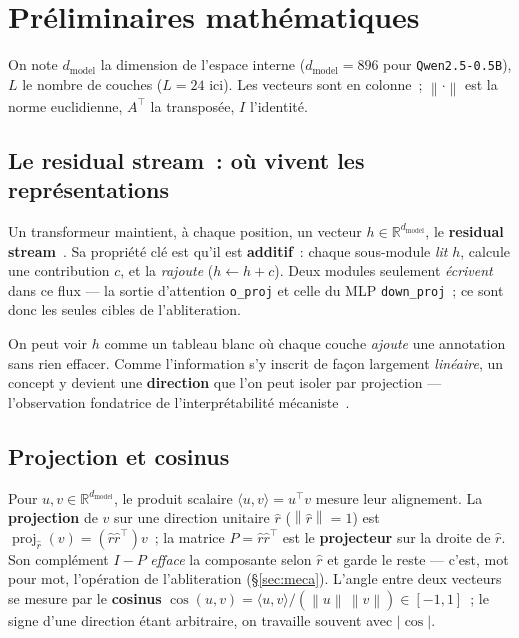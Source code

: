\documentclass[11pt,a4paper]{article}
\theoremstyle{definition}
\theoremstyle{plain}
\newcommand{\R}{\mathbb{R}}
\newcommand{\rhat}{\hat{r}}
\newcommand{\norm}[1]{\left\lVert #1 \right\rVert}
\newcommand{\inner}[2]{\langle #1, #2 \rangle}
\newcommand{\dmodel}{d_{\text{model}}}
\DeclareMathOperator{\proj}{proj}
\begin{document}
\section{Préliminaires mathématiques}\label{sec:prelim}
On note $\dmodel$ la dimension de l'espace interne ($\dmodel=896$ pour
\texttt{Qwen2.5-0.5B}), $L$ le nombre de couches ($L=24$ ici). Les vecteurs sont en
colonne~; $\norm{\cdot}$ est la norme euclidienne, $A^\top$ la transposée, $I$
l'identité.

\subsection{Le \og residual stream\fg{}~: où vivent les représentations}
Un transformeur maintient, à chaque position, un vecteur $h\in\R^{\dmodel}$, le
\textbf{residual stream}~\cite{elhage2021}. Sa propriété clé est qu'il est
\textbf{additif}~: chaque sous-module \emph{lit} $h$, calcule une contribution $c$,
et la \emph{rajoute} ($h\leftarrow h+c$). Deux modules seulement \emph{écrivent}
dans ce flux — la sortie d'attention \texttt{o\_proj} et celle du MLP
\texttt{down\_proj}~; ce sont donc les seules cibles de l'abliteration.

\begin{intuition}
On peut voir $h$ comme un tableau blanc où chaque couche \emph{ajoute} une
annotation sans rien effacer. Comme l'information s'y inscrit de façon largement
\emph{linéaire}, un concept y devient une \textbf{direction} que l'on peut isoler
par projection — l'observation fondatrice de l'interprétabilité
mécaniste~\cite{elhage2021}.
\end{intuition}

\subsection{Projection et cosinus}
Pour $u,v\in\R^{\dmodel}$, le produit scalaire $\inner{u}{v}=u^\top v$ mesure leur
alignement. La \textbf{projection} de $v$ sur une direction unitaire $\rhat$
($\norm{\rhat}=1$) est $\proj_{\rhat}(v)=(\rhat\rhat^\top)v$~; la matrice
$P=\rhat\rhat^\top$ est le \textbf{projecteur} sur la droite de $\rhat$. Son
complément $I-P$ \emph{efface} la composante selon $\rhat$ et garde le reste —
c'est, mot pour mot, l'opération de l'abliteration (\S\ref{sec:meca}). L'angle
entre deux vecteurs se mesure par le \textbf{cosinus}
$\cos(u,v)=\inner{u}{v}/(\norm{u}\,\norm{v})\in[-1,1]$~; le signe d'une direction
étant arbitraire, on travaille souvent avec $\lvert\cos\rvert$.
\end{document}
